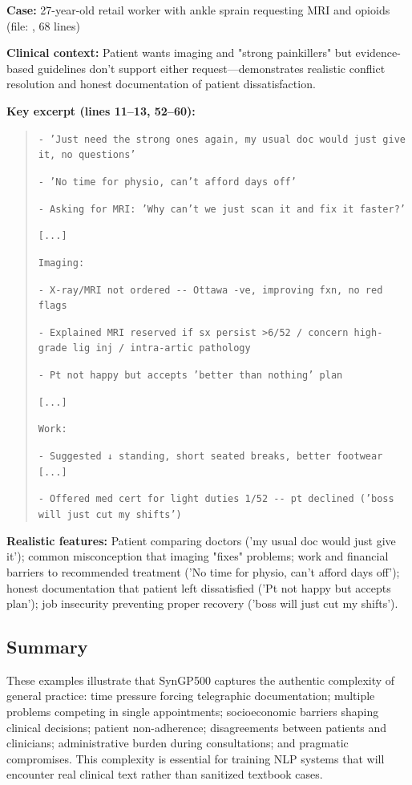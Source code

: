 \documentclass[11pt]{article}
\begin{document}
\textbf{Case:} 27-year-old retail worker with ankle sprain requesting MRI and opioids (file: , 68 lines)

\textbf{Clinical context:} Patient wants imaging and "strong painkillers" but evidence-based guidelines don't support either request—demonstrates realistic conflict resolution and honest documentation of patient dissatisfaction.

\textbf{Key excerpt (lines 11--13, 52--60):}
\begin{quote}
\small
\texttt{- 'Just need the strong ones again, my usual doc would just give it, no questions'}

\texttt{- 'No time for physio, can't afford days off'}

\texttt{- Asking for MRI: 'Why can't we just scan it and fix it faster?'}

\texttt{[...]}

\texttt{Imaging:}

\texttt{- X-ray/MRI not ordered {-}{-} Ottawa -ve, improving fxn, no red flags}

\texttt{- Explained MRI reserved if sx persist >6/52 / concern high-grade lig inj / intra-artic pathology}

\texttt{- Pt not happy but accepts 'better than nothing' plan}

\texttt{[...]}

\texttt{Work:}

\texttt{- Suggested ↓ standing, short seated breaks, better footwear [...]}

\texttt{- Offered med cert for light duties 1/52 {-}{-} pt declined ('boss will just cut my shifts')}
\end{quote}

\textbf{Realistic features:} Patient comparing doctors ('my usual doc would just give it'); common misconception that imaging "fixes" problems; work and financial barriers to recommended treatment ('No time for physio, can't afford days off'); honest documentation that patient left dissatisfied ('Pt not happy but accepts plan'); job insecurity preventing proper recovery ('boss will just cut my shifts').

\subsection{Summary}

These examples illustrate that SynGP500 captures the authentic complexity of general practice: time pressure forcing telegraphic documentation; multiple problems competing in single appointments; socioeconomic barriers shaping clinical decisions; patient non-adherence; disagreements between patients and clinicians; administrative burden during consultations; and pragmatic compromises. This complexity is essential for training NLP systems that will encounter real clinical text rather than sanitized textbook cases.
\end{document}
